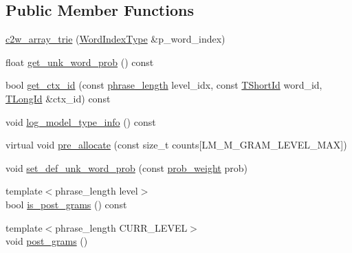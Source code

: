 \subsection*{Public Member Functions}
\begin{DoxyCompactItemize}
\item 
\hyperlink{classuva_1_1smt_1_1bpbd_1_1server_1_1lm_1_1c2w__array__trie_a2f65e7a797b83bf855ffe24a60f6ecbf}{c2w\+\_\+array\+\_\+trie} (\hyperlink{classuva_1_1smt_1_1bpbd_1_1server_1_1lm_1_1word__index__trie__base_a64279b5b94c421b25aedaa72e73d013c}{Word\+Index\+Type} \&p\+\_\+word\+\_\+index)
\item 
float \hyperlink{classuva_1_1smt_1_1bpbd_1_1server_1_1lm_1_1c2w__array__trie_aaa984f4a288c6dc1bb3e9e77834b01c7}{get\+\_\+unk\+\_\+word\+\_\+prob} () const 
\item 
bool \hyperlink{classuva_1_1smt_1_1bpbd_1_1server_1_1lm_1_1c2w__array__trie_a76ee8b0bd14bee3430271c2b4b724dc9}{get\+\_\+ctx\+\_\+id} (const \hyperlink{namespaceuva_1_1smt_1_1bpbd_1_1server_af068a19c2e03116caf3e3827a3e40e35}{phrase\+\_\+length} level\+\_\+idx, const \hyperlink{namespaceuva_1_1smt_1_1bpbd_1_1server_1_1lm_1_1identifiers_a33043a191e9a637dea742a89d23c8bdc}{T\+Short\+Id} word\+\_\+id, \hyperlink{namespaceuva_1_1smt_1_1bpbd_1_1server_1_1lm_1_1identifiers_a6841847096e455ad3c38689bc548b3b0}{T\+Long\+Id} \&ctx\+\_\+id) const 
\item 
void \hyperlink{classuva_1_1smt_1_1bpbd_1_1server_1_1lm_1_1c2w__array__trie_ab34950501079f4e4eb612c5afe20e694}{log\+\_\+model\+\_\+type\+\_\+info} () const 
\item 
virtual void \hyperlink{classuva_1_1smt_1_1bpbd_1_1server_1_1lm_1_1c2w__array__trie_a81439cb205ceb202279c395e15dc4c8e}{pre\+\_\+allocate} (const size\+\_\+t counts\mbox{[}L\+M\+\_\+\+M\+\_\+\+G\+R\+A\+M\+\_\+\+L\+E\+V\+E\+L\+\_\+\+M\+A\+X\mbox{]})
\item 
void \hyperlink{classuva_1_1smt_1_1bpbd_1_1server_1_1lm_1_1c2w__array__trie_ac955b8d0f0bcfb7727cc9f328bfdedd9}{set\+\_\+def\+\_\+unk\+\_\+word\+\_\+prob} (const \hyperlink{namespaceuva_1_1smt_1_1bpbd_1_1server_a01e9ea4de9c226f4464862e84ff0bbcc}{prob\+\_\+weight} prob)
\item 
{\footnotesize template$<$phrase\+\_\+length level$>$ }\\bool \hyperlink{classuva_1_1smt_1_1bpbd_1_1server_1_1lm_1_1c2w__array__trie_a38b623ad6bb56e05dfd0ccf1951cac0a}{is\+\_\+post\+\_\+grams} () const 
\item 
{\footnotesize template$<$phrase\+\_\+length C\+U\+R\+R\+\_\+\+L\+E\+V\+E\+L$>$ }\\void \hyperlink{classuva_1_1smt_1_1bpbd_1_1server_1_1lm_1_1c2w__array__trie_afe108069b67b7b0a2a814e07cbfc1304}{post\+\_\+grams} ()

\end{DoxyCompactItemize}
